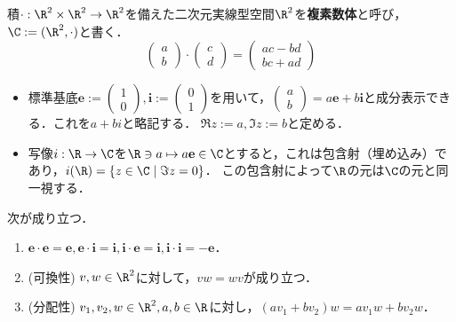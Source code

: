 \documentclass[uplatex, dvipdfmx]{jsreport}
\begin{document}
\begin{definition}\label{def-complex-numbers-1}
    積$\cdot:\R^2\times\R^2\to\R^2$を備えた二次元実線型空間$\R^2$を\textbf{複素数体}と呼び，$\C:=(\R^2,\cdot)$と書く．
    \[\begin{pmatrix}a\\b\end{pmatrix}\cdot\begin{pmatrix}c\\d\end{pmatrix}=\begin{pmatrix}ac-bd\\bc+ad\end{pmatrix}\]
    \begin{itemize}
        \item 標準基底$\mathbf{e}:=\begin{pmatrix}1\\0\end{pmatrix},\mathbf{i}:=\begin{pmatrix}0\\1\end{pmatrix}$を用いて，$\begin{pmatrix}a\\b\end{pmatrix}=a\mathbf{e}+b\mathbf{i}$と成分表示できる．これを$a+bi$と略記する．
        $\Re z:=a, \Im z:=b$と定める．
        \item 写像$i:\R\to\C$を$\R\ni a\mapsto a\mathbf{e}\in\C$とすると，これは包含射（埋め込み）であり，$i(\R)=\{z\in\C\mid\Im z=0\}$．
        この包含射によって$\R$の元は$\C$の元と同一視する．
    \end{itemize}
\end{definition}
\begin{lemma}
    次が成り立つ．
    \begin{enumerate}
        \item $\mathbf{e\cdot e=e, e\cdot i=i, i\cdot e=i, i\cdot i=-e}$．
        \item(可換性) $v,w\in\R^2$に対して，$vw=wv$が成り立つ．
        \item(分配性) $v_1,v_2,w\in\R^2,a,b\in\R$に対し，$(av_1+bv_2)w=av_1w+bv_2w$．
    \end{enumerate}
\end{lemma}
\end{document}
